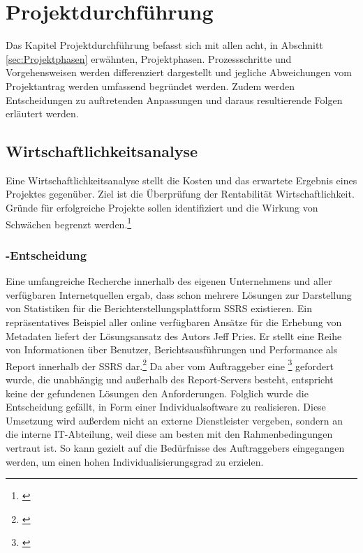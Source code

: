 \section{Projektdurchführung} 
\label{sec:Projektdurchführung}
Das Kapitel Projektdurchführung befasst sich mit allen acht, in Abschnitt \ref{sec:Projektphasen} erwähnten, Projektphasen. Prozessschritte und Vorgehensweisen werden differenziert dargestellt und jegliche Abweichungen vom Projektantrag werden umfassend begründet werden. Zudem werden Entscheidungen zu auftretenden Anpassungen und daraus resultierende Folgen erläutert werden.


\subsection{Wirtschaftlichkeitsanalyse}
\label{sec:Wirtschaftlichkeitsanalyse}
Eine Wirtschaftlichkeitsanalyse stellt die Kosten und das erwartete Ergebnis eines Projektes gegenüber. Ziel ist die Überprüfung der Rentabilität \bzw Wirtschaftlichkeit. Gründe für erfolgreiche Projekte sollen identifiziert und die Wirkung von Schwächen begrenzt werden.\footnote{\Vgl \cite{finlex:wa}}\\

\subsubsection{-Entscheidung}
\label{sec:MakeOrBuyEntscheidung}
Eine umfangreiche Recherche innerhalb des eigenen Unternehmens und aller verfügbaren Internetquellen ergab, dass schon mehrere Lösungen zur Darstellung von Statistiken für die Berichterstellungsplattform \ac{SSRS} existieren. Ein repräsentatives Beispiel aller online verfügbaren Ansätze für die Erhebung von Metadaten liefert der Lösungsansatz des Autors Jeff Pries. Er stellt eine Reihe von Informationen über Benutzer, Berichtsausführungen und Performance als Report innerhalb der \ac{SSRS} dar.\footnote{\Vgl \cite{pries:usage}} Da aber vom Auftraggeber eine \footnote{\cite{Projektantrag}} gefordert wurde, die unabhängig und außerhalb des Report-Servers besteht, entspricht keine der gefundenen Lösungen den Anforderungen. Folglich wurde die Entscheidung gefällt, \projektName in Form einer Individualsoftware zu realisieren. Diese Umsetzung wird außerdem nicht an externe Dienstleister vergeben, sondern an die interne IT-Abteilung, weil diese am besten mit den Rahmenbedingungen vertraut ist. So kann gezielt auf die Bedürfnisse des Auftraggebers \teamName eingegangen werden, um einen hohen Individualisierungsgrad zu erzielen.


